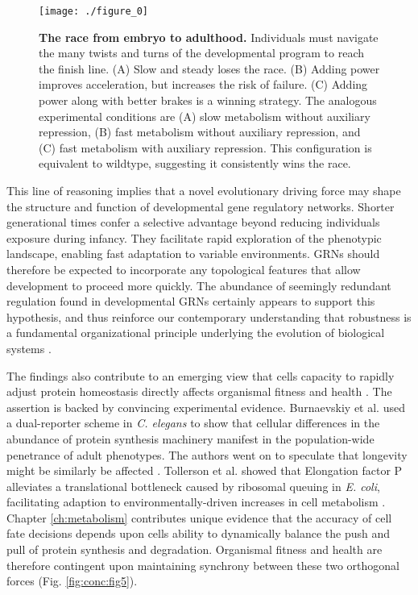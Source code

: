 \begin{figure}[h!]
\centering
\texttt{[image: ./figure\_0]}
\caption[The race from embryo to adulthood.]{\textbf{The race from embryo to adulthood.} Individuals must navigate the many twists and turns of the developmental program to reach the finish line. (A) Slow and steady loses the race. (B) Adding power improves acceleration, but increases the risk of failure. (C) Adding power along with better brakes is a winning strategy. The analogous experimental conditions are (A) slow metabolism without auxiliary repression, (B) fast metabolism without auxiliary repression, and (C) fast metabolism with auxiliary repression. This configuration is equivalent to wildtype, suggesting it consistently wins the race.}
\label{fig:conc:fig0}
\end{figure}

This line of reasoning implies that a novel evolutionary driving force may shape the structure and function of developmental gene regulatory networks. Shorter generational times confer a selective advantage beyond reducing individuals exposure during infancy. They facilitate rapid exploration of the phenotypic landscape, enabling fast adaptation to variable environments. GRNs should therefore be expected to incorporate any topological features that allow development to proceed more quickly. The abundance of seemingly redundant regulation found in developmental GRNs certainly appears to support this hypothesis, and thus reinforce our contemporary understanding that robustness is a fundamental organizational principle underlying the evolution of biological systems \cite{Kitano2004,Stelling2004}. 

The findings also contribute to an emerging view that cells capacity to rapidly adjust protein homeostasis directly affects organismal fitness and health \cite{Visscher2016,Tollerson2018,Burnaevskiy2018}. The assertion is backed by convincing experimental evidence. Burnaevskiy et al. used a dual-reporter scheme in \textit{C. elegans} to show that cellular differences in the abundance of protein synthesis machinery manifest in the population-wide penetrance of adult phenotypes. The authors went on to speculate that longevity might be similarly be affected \cite{Burnaevskiy2018}. Tollerson et al. showed that Elongation factor P alleviates a translational bottleneck caused by ribosomal queuing in \textit{E. coli}, facilitating adaption to environmentally-driven increases in cell metabolism \cite{Tollerson2018}. Chapter \ref{ch:metabolism} contributes unique evidence that the accuracy of cell fate decisions depends upon cells ability to dynamically balance the push and pull of protein synthesis and degradation. Organismal fitness and health are therefore contingent upon maintaining synchrony between these two orthogonal forces (Fig. \ref{fig:conc:fig5}).

